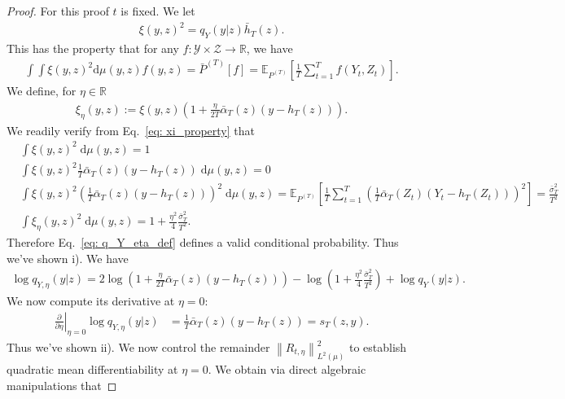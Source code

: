 \documentclass[10pt,a4paper]{amsart}
\begin{document}
\begin{proof}
For this proof $t$ is fixed. We let 
    \begin{align*}
        \xi(y,z)^2 = q_Y(y|z)\bar{h}_T(z).
    \end{align*}
    This has the property that for any $f : \mathcal{Y}\times \mathcal{Z}\to \mathbb{R}$, we have
    \begin{align}
        \int \int \xi(y,z)^2\mathrm{d}\mu(y,z)f(y,z) = \bar{P}^{(T)}[f] = \mathbb{E}_{P^{(T)}}\left[\frac{1}{T}\sum_{t=1}^{T}f(Y_t, Z_t)\right]\label{eq: xi_property}. 
    \end{align}
    We define, for $\eta\in \mathbb{R}$
    \begin{align*}
        \xi_\eta (y,z) := \xi(y,z)\left(1 + \frac{\eta}{2T}\bar{\alpha}_T(z)(y - h_T(z))\right). 
    \end{align*}
    We readily verify from Eq.~\eqref{eq: xi_property} that 
    \begin{align*}
        &\int \xi(y,z)^2\;\mathrm{d}\mu(y,z) = 1\\
        &\int \xi(y,z)^2\frac{1}{T}\bar{\alpha}_T(z)(y - h_T(z))\;\mathrm{d}\mu(y,z) = 0\\
        &\int \xi(y,z)^2\left(\frac{1}{T}\bar{\alpha}_T(z)(y - h_T(z))\right)^2\;\mathrm{d}\mu(y,z) = \mathbb{E}_{P^{(T)}}\left[\frac{1}{T}\sum_{t=1}^{T}\left(\frac{1}{T}\bar{\alpha}_T(Z_t)(Y_t - h_T(Z_t))\right)^2\right] = \frac{\bar{\sigma}_T^2}{T^2}\\
        &\int \xi_{\eta}(y,z)^2\;\mathrm{d}\mu(y,z) = 1 + \frac{\eta^2}{4}\frac{\bar{\sigma}_T^2}{T^2}.
    \end{align*}
    Therefore Eq.~\eqref{eq: q_Y_eta_def} defines a valid conditional probability. Thus we've shown i). We have
    \begin{align*}
        \log q_{Y,\eta}(y|z) = 2\log \left(1 + \frac{\eta}{2T}\bar{\alpha}_T(z)(y - h_T(z))\right)- \log \left(1 + \frac{\eta^2}{4}\frac{\bar{\sigma}_T^2}{T^2}\right) + \log q_Y(y|z). 
    \end{align*}
    We now compute its derivative at $\eta = 0$:
    \begin{align*}
        \left.\frac{\partial}{\partial\eta}\right|_{\eta = 0}\log q_{Y,\eta}(y|z) &= \frac{1}{T}\bar{\alpha}_T(z)(y - h_T(z)) = s_T(z,y).
    \end{align*}
    Thus we've shown ii). We now control the remainder $\left\|R_{t,\eta}\right\|_{L^2(\mu)}^2$ to establish quadratic mean differentiability at $\eta = 0$. We obtain via direct algebraic manipulations that 

\end{proof}
\end{document}
